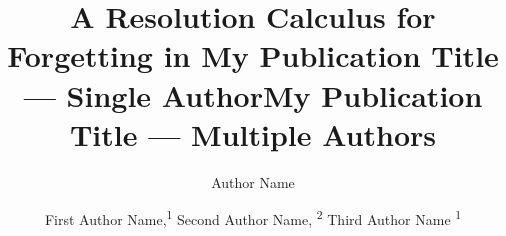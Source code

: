 \documentclass[letterpaper]{article} %
\title{A Resolution Calculus for Forgetting in \CTL}
\author{

}
\title{My Publication Title --- Single Author}
\author {
    Author Name \\
}
\title{My Publication Title --- Multiple Authors}
\author {

        First Author Name,\textsuperscript{\rm 1}
        Second Author Name, \textsuperscript{\rm 2}
        Third Author Name \textsuperscript{\rm 1} \\
}
\begin{document}
 \newcommand{\tuple}[1]{{\langle{#1}\rangle}}
\newcommand{\Mod}{\textit{Mod}}
\newcommand\ie{{\it i.e. }}
\newcommand\eg{{\it e.g.}}
\newtheorem{definition}{Definition}
\newtheorem{examp}{Example}
\newenvironment{example}{\begin{examp}\rm}{\end{examp}}
\newtheorem{lemma}{Lemma}
\newtheorem{proposition}{Proposition}
\newtheorem{theorem}{Theorem}
\newtheorem{corollary}[theorem]{Corollary}
\newcommand{\rto}{\rightarrow}
\newcommand{\lto}{\leftarrow}
\newcommand{\lrto}{\leftrightarrow}
\newcommand{\Rto}{\Rightarrow}
\newcommand{\Lto}{\Leftarrow}
\newcommand{\LRto}{\Leftrightarrow}
\newcommand{\Var}{\textit{Var}}
\newcommand{\Forget}{\textit{Forget}}
\newcommand{\KForget}{\textit{KForget}}
\newcommand{\TForget}{\textit{TForget}}
\newcommand{\Fst}{\textit{Fst}}
\newcommand{\dep}{\textit{dep}}
\newcommand{\term}{\textit{term}}
\newcommand{\literal}{\textit{literal}}

\newcommand{\Atom}{\mathcal{A}}
\newcommand{\SFive}{\textbf{S5}}
\newcommand{\MPK}{\textsc{k}}
\newcommand{\MPB}{\textsc{b}}
\newcommand{\MPT}{\textsc{t}}
\newcommand{\MPA}{\forall}
\newcommand{\MPE}{\exists}

\newcommand{\DNF}{\textit{DNF}}
\newcommand{\CNF}{\textit{CNF}}

\newcommand{\degree}{\textit{degree}}
\newcommand{\sunfold}{\textit{sunfold}}

\newcommand{\Pos}{\textit{Pos}}
\newcommand{\Neg}{\textit{Neg}}
\newcommand\wrt{{\it w.r.t.}}
\newcommand{\Hm} {{\cal M}}
\newcommand{\Hw} {{\cal W}}
\newcommand{\Hr} {{\cal R}}
\newcommand{\Hb} {{\cal B}}
\newcommand{\Ha} {{\cal A}}

\newcommand{\Dsj}{\triangledown}

\newcommand{\wnext}{\widetilde{\bigcirc}}
\newcommand{\nex}{\bigcirc}
\newcommand{\ness}{\square}
\newcommand{\qness}{\boxminus}
\newcommand{\wqnext}{\widetilde{\circleddash}}
\newcommand{\qnext}{\circleddash}
\newcommand{\may}{\lozenge}
\newcommand{\qmay}{\blacklozenge}
\newcommand{\unt} {{\cal U}}
\newcommand{\since} {{\cal S}}
\newcommand{\SNF} {\textit{SNF$_C$}}
\newcommand{\start}{\textbf{start}}
\newcommand{\Elm}{\textit{Elm}}
\newcommand{\simp}{\textbf{simp}}
\newcommand{\nnf}{\textbf{nnf}}

\newcommand{\CTL}{\textrm{CTL}}
\newcommand{\Ind}{\textrm{Ind}}
\newcommand{\Tran}{\textrm{Tran}}
\newcommand{\Sub}{\textrm{Sub}}
\newcommand{\NI}{\textrm{NI}}
\newcommand{\Inst}{\textrm{Inst}}
\newcommand{\Com}{\textrm{Com}}
\newcommand{\Rp}{\textrm{Rp}}
\newcommand{\forget}{{\textsc{f}_\CTL}}
\newcommand{\ALL}{\textsc{a}}
\newcommand{\EXIST}{\textsc{e}}
\newcommand{\NEXT}{\textsc{x}}
\newcommand{\FUTURE}{\textsc{f}}
\newcommand{\UNTIL}{\textsc{u}}
\newcommand{\GLOBAL}{\textsc{g}}
\newcommand{\UNLESS}{\textsc{w}}
\newcommand{\Def}{\textrm{def}}
\newcommand{\IR}{\textrm{IR}}
\newcommand{\Tr}{\textrm{Tr}}
\newcommand{\dis}{\textrm{dis}}
\def\PP{\ensuremath{\textbf{PP}}}
\def\NgP{\ensuremath{\textbf{NP}}}
\def\W{\ensuremath{\textbf{W}}}
\newcommand{\Pre}{\textrm{Pre}}
\newcommand{\Post}{\textrm{Post}}
\end{document}
